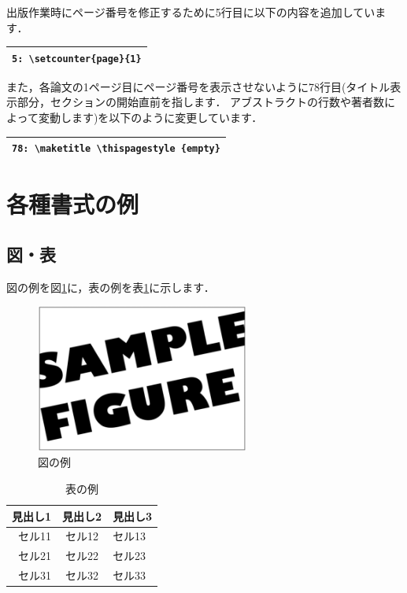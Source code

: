 \documentclass[T,J]{fose} %
\begin{document}
出版作業時にページ番号を修正するために5行目に以下の内容を追加しています．

\begin{tabularx}{23zw}{|X|}
	\hline
	\verb|5: \setcounter{page}{1}|
	\\
	\hline
\end{tabularx}

また，各論文の1ページ目にページ番号を表示させないように78行目(タイトル表示部分，セクションの開始直前を指します．
アブストラクトの行数や著者数によって変動します)を以下のように変更しています．\\

\begin{tabularx}{23zw}{|X|}
	\hline
	\verb|78: \maketitle \thispagestyle {empty}|
	\\
	\hline
\end{tabularx}

\section{各種書式の例}
\subsection{図・表}
図の例を図\ref{fig:figExample}に，表の例を表\ref{table:tableExample}に示します．

\begin{figure}[tb]
	\centering
	\includegraphics[width=7.0cm]{image/sampleFig.png}
	\caption{図の例}
	\label{fig:figExample}
\end{figure}

\begin{table}[tb]
	\centering
	\caption{表の例}
	\label{table:tableExample}
	\begin{tabular}{rcl}
		\hline %
		見出し1 & 見出し2& 見出し3 \\ \hline
		\hline %
		セル11 & セル12 & セル13 \\ \hline
		セル21 & セル22 & セル23 \\ \hline
		セル31 & セル32 & セル33 \\ \hline
		\hline
	\end{tabular}
\end{table}
\end{document}
